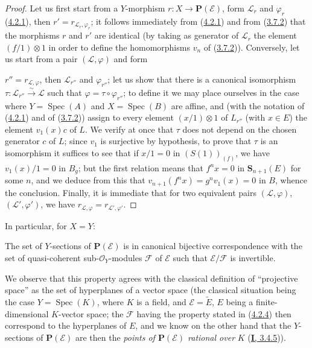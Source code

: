 \begin{proof}
Let us first start from a $Y$-morphism $r:X\to\mathbf{P}(\mathcal{E})$, form
$\mathcal{L}_r$ and $\varphi_r$ (\hyperref[II.4.2.1]{4.2.1}), then
$r'=r_{\mathcal{L}_r,\varphi_r}$; it follows immediately from
(\hyperref[II.4.2.1]{4.2.1}) and from
(\hyperref[II.3.7.2]{3.7.2}) that the morphisms $r$ and $r'$ are
identical (by taking as generator of $\mathcal{L}_r$ the element
$(f/1)\otimes1$ in order to define the homomorphisms $v_n$ of
(\hyperref[II.3.7.2]{3.7.2})). Conversely, let us start from a pair
$(\mathcal{L},\varphi)$ and form


$r''=r_{\mathcal{L},\varphi}$, then $\mathcal{L}_{r''}$ and
$\varphi_{r''}$; let us show that there is a canonical isomorphism
$\tau:\mathcal{L}_{r''}\xrightarrow{\sim}\mathcal{L}$ such that
$\varphi=\tau\circ\varphi_{r''}$; to define it we may place ourselves in the
case where $Y=\operatorname{Spec}(A)$ and $X=\operatorname{Spec}(B)$ are affine,
and (with the notation of (\hyperref[II.4.2.1]{4.2.1}) and of
(\hyperref[II.3.7.2]{3.7.2})) assign to every element
$(x/1)\otimes1$ of $L_{r''}$ (with $x\in E$) the element $v_1(x)c$ of $L$. We
verify at once that $\tau$ does not depend on the chosen generator $c$ of $L$;
since $v_1$ is surjective by hypothesis, to prove that $\tau$ is an
isomorphism it suffices to see that if $x/1=0$ in $(S(1))_{(f)}$, we have
$v_1(x)/1=0$ in $B_g$; but the first relation means that $f^nx=0$
in $\mathbf{S}_{n+1}(E)$ for some $n$, and we deduce from this that
$v_{n+1}(f^nx)=g^nv_1(x)=0$ in $B$, whence the conclusion. Finally, it is
immediate that for two equivalent pairs $(\mathcal{L},\varphi)$,
$(\mathcal{L}',\varphi')$, we have
$r_{\mathcal{L},\varphi}=r_{\mathcal{L}',\varphi'}$.
\end{proof}

In particular, for $X=Y$:

\begin{theorem}[4.2.4]
\label{II.4.2.4}
The set of $Y$-sections of $\mathbf{P}(\mathcal{E})$ is in canonical
bijective correspondence with the set of quasi-coherent
sub-$\mathcal{O}_Y$-modules $\mathcal{F}$ of $\mathcal{E}$
such that $\mathcal{E}/\mathcal{F}$ is invertible.
\end{theorem}

We observe that this property agrees with the classical definition of
``projective space'' as the set of hyperplanes of a vector
space (the classical situation being the case $Y=\operatorname{Spec}(K)$, where
$K$ is a field, and $\mathcal{E}=\widetilde{E}$, $E$ being a finite-dimensional
$K$-vector space; the $\mathcal{F}$ having the property stated
in (\hyperref[II.4.2.4]{4.2.4}) then correspond to the hyperplanes of
$E$, and we know on the other hand that the $Y$-sections of
$\mathbf{P}(\mathcal{E})$ are then the \emph{points of
$\mathbf{P}(\mathcal{E})$ rational over} $K$
(\hyperref[I.3.4.5]{\textbf{I}, 3.4.5})).

